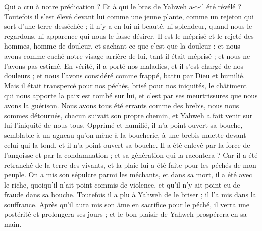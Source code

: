 \begin{multicols}{2}
\VerseOne{}Qui a cru à notre prédication ? Et à qui le bras de Yahweh a-t-il été révélé ?
Toutefois il s'est élevé devant lui comme une jeune plante, comme un rejeton qui sort d'une terre desséchée ; il n'y a en lui ni beauté, ni splendeur, quand nous le regardons, ni apparence qui nous le fasse désirer.
Il est le méprisé et le rejeté des hommes, homme de douleur, et sachant ce que c'est que la douleur : et nous avons comme caché notre visage arrière de lui, tant il était méprisé ; et nous ne l'avons pas estimé.
En vérité, il a porté nos maladies, et il s'est chargé de nos douleurs ; et nous l'avons considéré comme frappé, battu par Dieu et humilié.
Mais il était transpercé pour nos péchés, brisé pour nos iniquités, le châtiment qui nous apporte la paix est tombé sur lui, et c'est par ses meurtrissures que nous avons la guérison.
Nous avons tous été errants comme des brebis, nous nous sommes détournés, chacun suivait son propre chemin, et Yahweh a fait venir sur lui l'iniquité de nous tous.
Opprimé et humilié, il n'a point ouvert sa bouche, semblable à un agneau qu'on mène à la boucherie, à une brebis muette devant celui qui la tond, et il n'a point ouvert sa bouche.
Il a été enlevé par la force de l'angoisse et par la condamnation ; et sa génération qui la racontera ? Car il a été retranché de la terre des vivants, et la plaie lui a été faite pour les péchés de mon peuple.
On a mis son sépulcre parmi les méchants, et dans sa mort, il a été avec le riche, quoiqu'il n'ait point commis de violence, et qu'il n'y ait point eu de fraude dans sa bouche.
Toutefois il a plu à Yahweh de le briser ; il l'a mis dans la souffrance. Après qu'il aura mis son âme en sacrifice pour le péché, il verra une postérité et prolongera ses jours ; et le bon plaisir de Yahweh prospérera en sa main.

\end{multicols}
